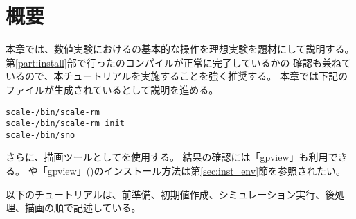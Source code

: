 \section{概要} \label{sec:ideal_exp_intro}

本章では、数値実験における{\scalerm}の基本的な操作を理想実験を題材にして説明する。
第\ref{part:install}部で行った{\scalelib}のコンパイルが正常に完了しているかの
確認も兼ねているので、本チュートリアルを実施することを強く推奨する。
本章では下記のファイルが生成されているとして説明を進める。
\begin{alltt}
  scale-{\version}/bin/scale-rm
  scale-{\version}/bin/scale-rm_init
  scale-{\version}/bin/sno
\end{alltt}
さらに、描画ツールとして\grads を使用する。
結果の確認には「gpview」も利用できる。
\grads や「gpview」(\gphys)のインストール方法は第\ref{sec:inst_env}節を参照されたい。

以下のチュートリアルは、前準備、初期値作成、シミュレーション実行、後処理、描画の順で記述している。
